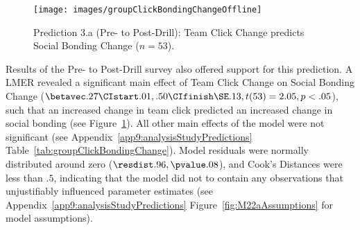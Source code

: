 \begin{CJK}{UTF8}{gbsn}
\begin{figure}
  \centering
    \texttt{[image: images/groupClickBondingChangeOffline]}
      \caption{Prediction 3.a (Pre- to Post-Drill): Team Click Change predicts Social Bonding Change ($n = 53$).}
    \label{fig:groupClickBondingChangeOffline}

\end{figure}


Results of the Pre- to Post-Drill survey also offered support for this prediction.  A LMER revealed a significant main effect of Team Click Change on Social Bonding Change ($\betavec .27 \CIstart .01, .50 \CIfinish \SE .13, t(53) = 2.05, p < .05$), such that an increased change in team click predicted an increased change in social bonding (see Figure~\ref{fig:groupClickBondingChangeOffline}).  All other main effects of the model were not significant (see Appendix~\ref{app9:analysisStudyPredictions} Table~\ref{tab:groupClickBondingChange}).  Model residuals were normally distributed around zero ($\resdist .96, \pvalue .08$), and Cook's Distances were less than $.5$, indicating that the model did not to contain any observations that unjustifiably influenced parameter estimates (see Appendix~\ref{app9:analysisStudyPredictions} Figure~\ref{fig:M22aAssumptions} for model assumptions).














\end{CJK}
